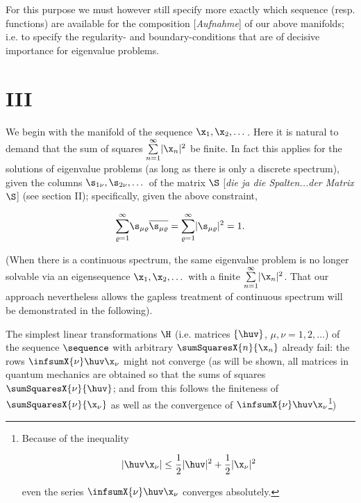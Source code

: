 \documentclass{article}
\newcommand{\WTF}[1]{
[\it{\small{#1}}]
}
\newcommand{\uequ}[1]{
\begin{align*}
#1
\end{align*}
}
\newcommand{\inv}[1]{\frac{1}{#1}}
\newcommand{\barred}[1]{
\overline{#1}
}
\renewcommand{\it}[1]{\textit{#1}}
\newcommand{\sumXY}[2]{\underset{#1}{\overset{#2}{\sum}}}
\begin{document}
For this purpose we must however still specify more exactly which sequence (resp. functions) are available for the composition\WTF{Aufnahme} of our above manifolds; i.e. to specify the regularity- and boundary-conditions that are of decisive importance for eigenvalue problems.

\section*{III}
We begin with the manifold of the sequence $\x_1,\x_2,\dots$. Here it is natural to demand that the sum of squares $\sumXY{n=1}{\infty}|\x_n|^2$ be finite. In fact this applies for the solutions of eigenvalue problems (as long as there is only a discrete spectrum), given the columns $\s_{1\nu},\s_{2\nu},\dots$ of the matrix $\S$\WTF{die ja die Spalten...der Matrix $\S$} (see section II); specifically, given the above constraint,
\uequ{
\sumXY{\varrho=1}{\infty}\s_{\mu\varrho}\barred{\s_{\mu\varrho}} = \sumXY{\varrho=1}{\infty}|\s_{\mu\varrho}|^2=1.
}
(When there is a continuous spectrum, the same eigenvalue problem is no longer solvable via an eigensequence $\x_1,\x_2,\dots$ with a finite $\sumXY{n=1}{\infty}|\x_n|^2$. That our approach nevertheless allows the gapless treatment of continuous spectrum will be demonstrated in the following).

The simplest linear transformations $\H$ (i.e. matrices $\lbrace\huv\rbrace$, $\mu,\nu=1,2,\dots$) of the sequence $\sequence$ with arbitrary $\sumSquaresX{n}{\x_n}$ already fail: the rows $\infsumX{\nu}\huv\x_\nu$ might not converge (as will be shown, all matrices in quantum mechanics are obtained so that the sums of squares $\sumSquaresX{\nu}{\huv}$; and from this follows the finiteness of $\sumSquaresX{\nu}{\x_\nu}$ as well as the convergence of $\infsumX{\nu}\huv\x_\nu$\footnote{Because of the inequality
\uequ{
|\huv\x_\nu| \leq \inv{2}|\huv|^2 + \inv{2}|\x_\nu|^2
}
even the series $\infsumX{\nu}\huv\x_\nu$ converges absolutely.
})
\end{document}
